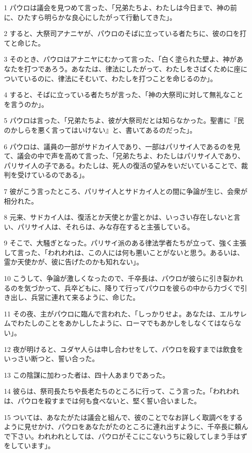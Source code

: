 \par 1 パウロは議会を見つめて言った、「兄弟たちよ、わたしは今日まで、神の前に、ひたすら明らかな良心にしたがって行動してきた」。
\par 2 すると、大祭司アナニヤが、パウロのそばに立っている者たちに、彼の口を打てと命じた。
\par 3 そのとき、パウロはアナニヤにむかって言った、「白く塗られた壁よ、神があなたを打つであろう。あなたは、律法にしたがって、わたしをさばくために座についているのに、律法にそむいて、わたしを打つことを命じるのか」。
\par 4 すると、そばに立っている者たちが言った、「神の大祭司に対して無礼なことを言うのか」。
\par 5 パウロは言った、「兄弟たちよ、彼が大祭司だとは知らなかった。聖書に『民のかしらを悪く言ってはいけない』と、書いてあるのだった」。
\par 6 パウロは、議員の一部がサドカイ人であり、一部はパリサイ人であるのを見て、議会の中で声を高めて言った、「兄弟たちよ、わたしはパリサイ人であり、パリサイ人の子である。わたしは、死人の復活の望みをいだいていることで、裁判を受けているのである」。
\par 7 彼がこう言ったところ、パリサイ人とサドカイ人との間に争論が生じ、会衆が相分れた。
\par 8 元来、サドカイ人は、復活とか天使とか霊とかは、いっさい存在しないと言い、パリサイ人は、それらは、みな存在すると主張している。
\par 9 そこで、大騒ぎとなった。パリサイ派のある律法学者たちが立って、強く主張して言った、「われわれは、この人には何も悪いことがないと思う。あるいは、霊か天使かが、彼に告げたのかも知れない」。
\par 10 こうして、争論が激しくなったので、千卒長は、パウロが彼らに引き裂かれるのを気づかって、兵卒どもに、降りて行ってパウロを彼らの中から力づくで引き出し、兵営に連れて来るように、命じた。
\par 11 その夜、主がパウロに臨んで言われた、「しっかりせよ。あなたは、エルサレムでわたしのことをあかししたように、ローマでもあかしをしなくてはならない」。
\par 12 夜が明けると、ユダヤ人らは申し合わせをして、パウロを殺すまでは飲食をいっさい断つと、誓い合った。
\par 13 この陰謀に加わった者は、四十人あまりであった。
\par 14 彼らは、祭司長たちや長老たちのところに行って、こう言った。「われわれは、パウロを殺すまでは何も食べないと、堅く誓い合いました。
\par 15 ついては、あなたがたは議会と組んで、彼のことでなお詳しく取調べをするように見せかけ、パウロをあなたがたのところに連れ出すように、千卒長に頼んで下さい。われわれとしては、パウロがそこにこないうちに殺してしまう手はずをしています」。
